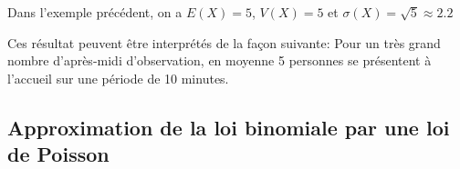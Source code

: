\documentclass[a4paper,12pt,openany]{book}
\begin{document}
\bigskip


\bigskip

\rem Dans l'exemple précédent, on a $E(X)=5$, $V(X)=5$ et $\sigma(X)=\sqrt{5}\approx 2.2$

Ces résultat peuvent être interprétés de la façon suivante: Pour un très grand nombre d'après-midi d'observation, en moyenne 5 personnes se présentent à l'accueil sur une période de 10 minutes.

\subsection{Approximation de la loi binomiale par une loi de Poisson}

\end{document}
